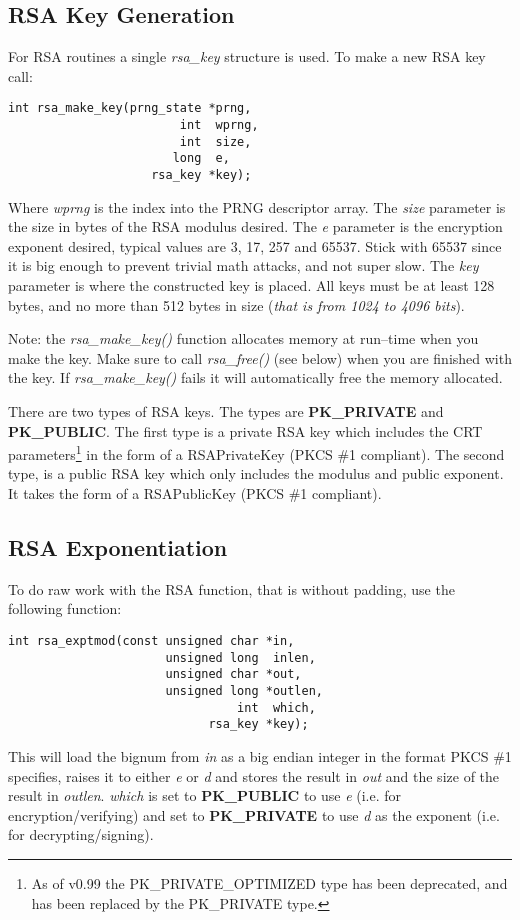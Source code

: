 \documentclass[synpaper]{book}
\begin{document}
\subsection{RSA Key Generation}

For RSA routines a single \textit{rsa\_key} structure is used.  To make a new RSA key call:
\begin{verbatim}
int rsa_make_key(prng_state *prng, 
                        int  wprng, 
                        int  size, 
                       long  e, 
                    rsa_key *key);
\end{verbatim}

Where \textit{wprng} is the index into the PRNG descriptor array.  The \textit{size} parameter is the size in bytes of the RSA modulus desired.
The \textit{e} parameter is the encryption exponent desired, typical values are 3, 17, 257 and 65537.  Stick with 65537 since it is big enough to prevent 
trivial math attacks, and not super slow.  The \textit{key} parameter is where the constructed key is placed.  All keys must be at 
least 128 bytes, and no more than 512 bytes in size (\textit{that is from 1024 to 4096 bits}).

Note: the \textit{rsa\_make\_key()} function allocates memory at run--time when you make the key.  Make sure to call 
\textit{rsa\_free()} (see below) when you are finished with the key.  If \textit{rsa\_make\_key()} fails it will automatically 
free the memory allocated.

 
There are two types of RSA keys.  The types are {\bf PK\_PRIVATE} and {\bf PK\_PUBLIC}.  The first type is a private 
RSA key which includes the CRT parameters\footnote{As of v0.99 the PK\_PRIVATE\_OPTIMIZED type has been deprecated, and has been replaced by the 
PK\_PRIVATE type.} in the form of a RSAPrivateKey (PKCS \#1 compliant).  The second type, is a public RSA key which only includes the modulus and public exponent.  
It takes the form of a RSAPublicKey (PKCS \#1 compliant).

\subsection{RSA Exponentiation}
To do raw work with the RSA function, that is without padding, use the following function:
\begin{verbatim}
int rsa_exptmod(const unsigned char *in,   
                      unsigned long  inlen,
                      unsigned char *out,  
                      unsigned long *outlen, 
                                int  which, 
                            rsa_key *key);
\end{verbatim}
This will load the bignum from \textit{in} as a big endian integer in the format PKCS \#1 specifies, raises it to either \textit{e} or \textit{d} and stores the result
in \textit{out} and the size of the result in \textit{outlen}. \textit{which} is set to {\bf PK\_PUBLIC} to use \textit{e} 
(i.e. for encryption/verifying) and set to {\bf PK\_PRIVATE} to use \textit{d} as the exponent (i.e. for decrypting/signing).
\end{document}
